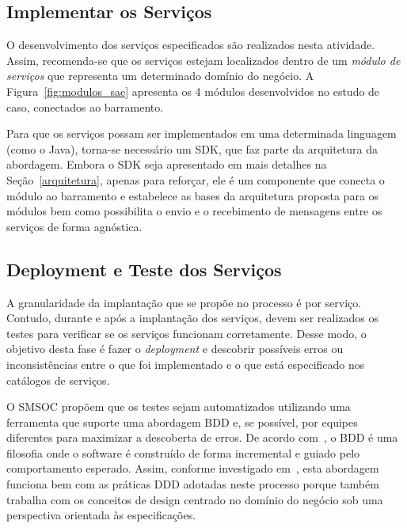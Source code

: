 \subsection{Implementar os Serviços}

O desenvolvimento
dos serviços especificados
são realizados nesta atividade. Assim,
recomenda-se que os serviços estejam 
localizados dentro de um 
\emph{módulo de serviços} que representa 
um determinado domínio do negócio.
A Figura~\ref{fig:modulos_sae} apresenta
os 4 módulos
desenvolvidos no estudo de caso,
conectados ao barramento.



Para que os serviços possam ser implementados
em uma determinada linguagem (como o Java),
torna-se necessário um \acrfull{SDK}, que faz parte 
da arquitetura da abordagem. 
Embora o \acrshort{SDK} seja apresentado em mais detalhes na
Seção~\ref{arquitetura}, apenas para
reforçar, ele é um componente que conecta o módulo
ao barramento
e estabelece as bases da arquitetura proposta
para os módulos bem como possibilita
o envio e o recebimento
de mensagens entre os serviços de forma agnóstica.








\subsection{Deployment e Teste dos Serviços}

A granularidade da implantação que se propõe no processo
é por serviço.
Contudo, durante e após a implantação dos serviços, 
devem ser realizados os testes para verificar se 
os serviços funcionam corretamente.
Desse modo, o objetivo desta fase é
fazer o \textit{deployment}
e descobrir possíveis erros 
ou inconsistências
entre o que foi implementado
e o que está especificado
nos catálogos de serviços.


O \acrshort{SMSOC} propõem que 
os testes sejam automatizados
utilizando uma ferramenta 
que suporte uma abordagem \acrfull{BDD}
e, se possível, por equipes diferentes
para maximizar a descoberta de erros. 
De acordo com~\cite{solis2011study},
o \acrshort{BDD} é
uma filosofia onde o software
é construído de forma incremental e
guiado pelo comportamento esperado.
Assim, conforme investigado em~\cite{ragonha2013jasmine},
esta abordagem funciona bem com as 
práticas \acrshort{DDD}
adotadas neste processo
porque também trabalha com os conceitos de 
design centrado no domínio do negócio
sob uma perspectiva orientada às especificações.

